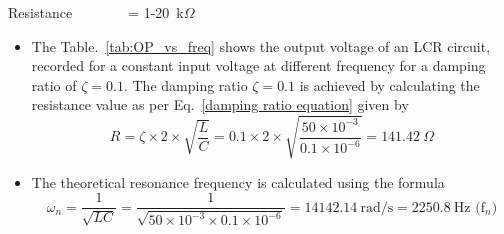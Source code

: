 \documentclass[11pt]{scrreprt}
\begin{document}
Resistance~~~~~~~~= 1-20~k$\Omega$\\
\begin{itemize}
\item The Table.~\ref{tab:OP_vs_freq} shows the output voltage of an LCR circuit, recorded for a constant input voltage at different frequency for a damping ratio of $\zeta = 0.1$. The damping ratio $\zeta = 0.1$ is achieved by calculating the resistance value as per Eq.~\ref{damping ratio equation} given by
\begin{equation}
    R = \zeta\times 2\times \sqrt{\frac{L}{C}} = 0.1\times 2\times \sqrt{\frac{50\times 10^{-3}}{0.1\times 10^{-6}}} = 141.42~\text{$\Omega$}
\end{equation}


\item The theoretical resonance frequency is calculated using the formula
\begin{equation}
    \omega_n = \frac{1}{\sqrt{LC}} = \frac{1}{\sqrt{50\times10^{-3}\times0.1\times10^{-6}}} = 14142.14~\text{rad/s} = 2250.8~\text{Hz (f$_{n}$)}
\end{equation}


\end{itemize}
\end{document}
